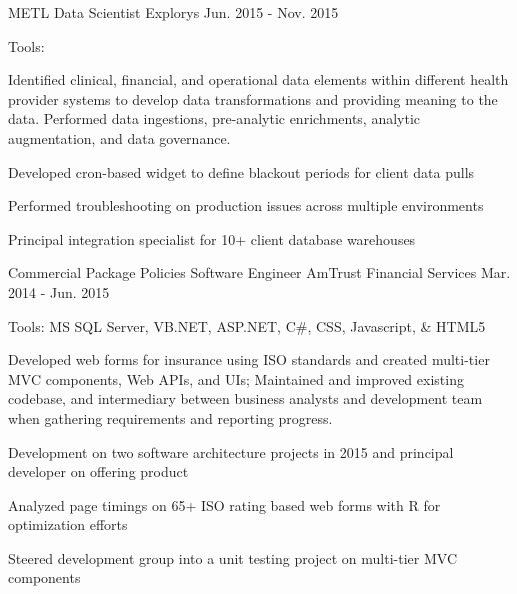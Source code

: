 \begin{cventries}
  \cvexpentry
    {METL} %
    {Data Scientist}
    {Explorys}
    {Jun. 2015 - Nov. 2015}
    {
      \begin{cvheavyparagraph}
        Tools:
      \end{cvheavyparagraph}
    }
    {
      \begin{cvparagraph}
        Identified clinical, financial, and operational data elements within different health provider systems to develop data transformations and providing meaning to the data. Performed data ingestions, pre-analytic enrichments, analytic augmentation, and data governance.
      \end{cvparagraph}
      \begin{cvitems} %
        \item {Developed cron-based widget to define blackout periods for client data pulls}
        \item {Performed troubleshooting on production issues across multiple environments}
        \item {Principal integration specialist for 10+ client database warehouses}
      \end{cvitems}
    }

  \cvexpentry
    {Commercial Package Policies}
    {Software Engineer} %
    {AmTrust Financial Services}
    {Mar. 2014 - Jun. 2015}
    {
      \begin{cvheavyparagraph}
        Tools: MS SQL Server, VB.NET, ASP.NET, C\#, CSS, Javascript, \& HTML5
      \end{cvheavyparagraph}
    }
    {
      \begin{cvparagraph}
        Developed web forms for insurance using ISO standards and created multi-tier MVC components, Web APIs, and UIs; Maintained and improved existing codebase,  and intermediary between business analysts and development team when gathering requirements and reporting progress.
      \end{cvparagraph}
      \begin{cvitems} %
        \item {Development on two software architecture projects in 2015 and principal developer on offering product}
        \item {Analyzed page timings on 65+ ISO rating based web forms with R for optimization efforts}
        \item {Steered development group into a unit testing project on multi-tier MVC components}
      \end{cvitems}
    }


\end{cventries}
